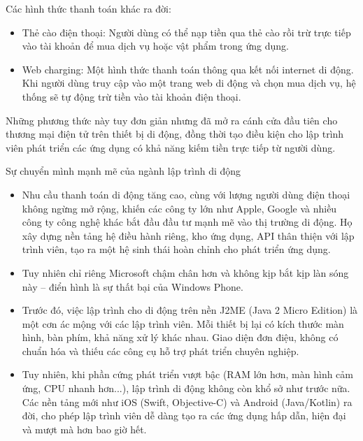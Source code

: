   \begin{flushleft}
    \hspace*{0.8cm}Các hình thức thanh toán khác ra đời:
    \setlength{\leftmargini}{1.5cm}
    \begin{itemize}
        \item Thẻ cào điện thoại: Người dùng có thể nạp tiền qua thẻ cào rồi trừ trực tiếp vào tài khoản để mua dịch vụ hoặc vật phẩm trong ứng dụng.
        \item Web charging: Một hình thức thanh toán thông qua kết nối internet di động. Khi người dùng truy cập vào một trang web di động và chọn mua dịch vụ, hệ thống sẽ tự động trừ tiền vào tài khoản điện thoại.
    \end{itemize}
  \end{flushleft}

  \begin{flushleft}
    \hspace*{0.8cm}Những phương thức này tuy đơn giản nhưng đã mở ra cánh cửa đầu tiên cho thương mại điện tử trên thiết bị di động, đồng thời tạo điều kiện cho lập trình viên phát triển các ứng dụng có khả năng kiếm tiền trực tiếp từ người dùng.
  \end{flushleft}

  \begin{flushleft}
    \hspace*{0.8cm}Sự chuyển mình mạnh mẽ của ngành lập trình di động
    \setlength{\leftmargini}{1.5cm}
    \begin{itemize}
        \item Nhu cầu thanh toán di động tăng cao, cùng với lượng người dùng điện thoại không ngừng mở rộng, khiến các công ty lớn như Apple, Google và nhiều công ty công nghệ khác bắt đầu đầu tư mạnh mẽ vào thị trường di động. Họ xây dựng nền tảng hệ điều hành riêng, kho ứng dụng, API thân thiện với lập trình viên, tạo ra một hệ sinh thái hoàn chỉnh cho phát triển ứng dụng.
        \item Tuy nhiên chỉ riêng Microsoft chậm chân hơn và không kịp bắt kịp làn sóng này – điển hình là sự thất bại của Windows Phone.
        \item Trước đó, việc lập trình cho di động trên nền J2ME (Java 2 Micro Edition) là một cơn ác mộng với các lập trình viên. Mỗi thiết bị lại có kích thước màn hình, bàn phím, khả năng xử lý khác nhau. Giao diện đơn điệu, không có chuẩn hóa và thiếu các công cụ hỗ trợ phát triển chuyên nghiệp.
        \item Tuy nhiên, khi phần cứng phát triển vượt bậc (RAM lớn hơn, màn hình cảm ứng, CPU nhanh hơn...), lập trình di động không còn khổ sở như trước nữa. Các nền tảng mới như iOS (Swift, Objective-C) và Android (Java/Kotlin) ra đời, cho phép lập trình viên dễ dàng tạo ra các ứng dụng hấp dẫn, hiện đại và mượt mà hơn bao giờ hết.
    \end{itemize}
  \end{flushleft}

